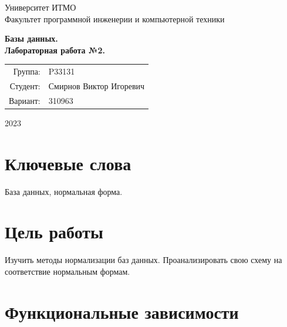 \documentclass{article}
\begin{document}
\begin{titlepage}
    \begin{center}
        \begin{spacing}{1.4}
            \large{Университет ИТМО} \\
            \large{Факультет программной инженерии и компьютерной техники} \\
        \end{spacing}
        \vfill
        \textbf{
            \huge{Базы данных.} \\
            \huge{Лабораторная работа №2.} \\
        }
    \end{center}
    \vfill
    \begin{center}
        \begin{tabular}{r l}
            Группа:  & P33131                  \\
            Студент: & Смирнов Виктор Игоревич \\
            Вариант: & 310963
        \end{tabular}
    \end{center}
    \vfill
    \begin{center}
        \begin{large}
            2023
        \end{large}
    \end{center}
\end{titlepage}

\section*{Ключевые слова}

База данных, нормальная форма.

\tableofcontents

\section{Цель работы}

Изучить методы нормализации баз данных.
Проанализировать свою схему на 
соответствие нормальным формам.

\section{Функциональные зависимости}
\end{document}
